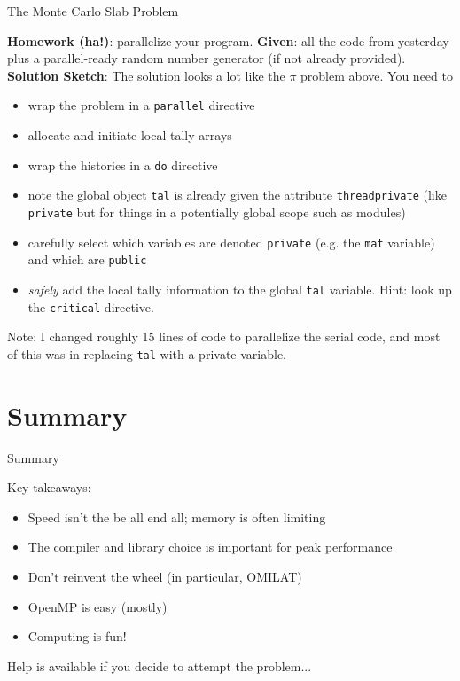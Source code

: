 \documentclass[10pt]{beamer}
\begin{document}
\begin{frame}{The Monte Carlo Slab Problem}

  {\bf Homework (ha!)}: parallelize your program.
  \vfill
  {\bf Given}: all the code from yesterday plus a parallel-ready random number 
  generator (if not already provided).
  \vfill
  {\bf Solution Sketch}: The solution looks a lot like the $\pi$ problem above.
  You need to 
  \begin{itemize}
    \item wrap the problem in a \texttt{parallel} directive
    \item allocate and initiate local tally arrays
    \item wrap the histories in a \texttt{do} directive
    \item note the global object \texttt{tal} is already given the attribute
          \texttt{threadprivate} (like \texttt{private} but for things in a 
          potentially global scope such as modules)
    \item carefully select which variables are denoted \texttt{private} (e.g.
          the \texttt{mat} variable) and which are \texttt{public}
    \item {\it safely} add the local tally information to the global \texttt{tal}
          variable.  Hint: look up the \texttt{critical} directive.
  \end{itemize}
  Note: I changed roughly 15 lines of code to parallelize the serial code, and most
  of this was in replacing \texttt{tal} with a private variable.
\end{frame}


\section{Summary}

\begin{frame}{Summary}

  Key takeaways:
  \begin{itemize}
  \item Speed isn't the be all end all; memory is often limiting
  \item The compiler and library choice is important for peak performance
  \item Don't reinvent the wheel (in particular, OMILAT)
  \item OpenMP is easy (mostly)
  \item Computing is fun!
  \end{itemize}
  \vfill
  Help is available if you decide to attempt the problem...

\end{frame}
\end{document}
